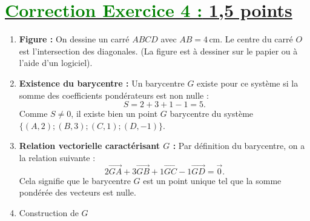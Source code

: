 \documentclass[12pt,a4paper]{article}
\begin{document}
\section*{\underline{\textcolor{green}{Correction Exercice 4 :} 1,5 points}}
\begin{enumerate}
    \item \textbf{Figure :} On dessine un carré \(ABCD\) avec \(AB = 4 \, \text{cm}\). Le centre du carré \(O\) est l’intersection des diagonales. (La figure est à dessiner sur le papier ou à l’aide d’un logiciel).

    \item \textbf{Existence du barycentre :} 
    Un barycentre \( G \) existe pour ce système si la somme des coefficients pondérateurs est non nulle :
    \[
    S = 2 + 3 + 1 - 1 = 5.
    \]
    Comme \( S \neq 0 \), il existe bien un point \( G \) barycentre du système \(\{(A, 2); (B, 3); (C, 1); (D, -1)\}\).
    \item \textbf{Relation vectorielle caractérisant \( G \) :} 
    Par définition du barycentre, on a la relation suivante :
    \[
    2 \overrightarrow{GA} + 3 \overrightarrow{GB} + 1 \overrightarrow{GC} - 1 \overrightarrow{GD} = \overrightarrow{0}.
    \]
    Cela signifie que le barycentre \( G \) est un point unique tel que la somme pondérée des vecteurs est nulle.

	\item Construction de \(G\)

\begin{center}
\end{center}
\end{enumerate}
\end{document}
